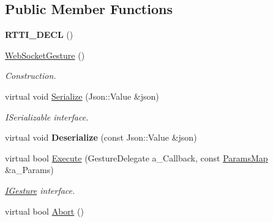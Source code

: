 \subsection*{Public Member Functions}
\begin{DoxyCompactItemize}
\item 
\mbox{\label{class_web_socket_gesture_a6c73dc4db74600f974b2378c9bc7949b}} 
{\bfseries R\+T\+T\+I\+\_\+\+D\+E\+CL} ()
\item 
\mbox{\label{class_web_socket_gesture_a2f02711e725da18c2e2d3fc305a26e57}} 
\hyperlink{class_web_socket_gesture_a2f02711e725da18c2e2d3fc305a26e57}{Web\+Socket\+Gesture} ()
\begin{DoxyCompactList}\small\item\em Construction. \end{DoxyCompactList}\item 
\mbox{\label{class_web_socket_gesture_afff9bc7e818b8fde0cdf37100430d5b4}} 
virtual void \hyperlink{class_web_socket_gesture_afff9bc7e818b8fde0cdf37100430d5b4}{Serialize} (Json\+::\+Value \&json)
\begin{DoxyCompactList}\small\item\em I\+Serializable interface. \end{DoxyCompactList}\item 
\mbox{\label{class_web_socket_gesture_ac47e05d2eed7b42a782e36d30615c2ed}} 
virtual void {\bfseries Deserialize} (const Json\+::\+Value \&json)
\item 
\mbox{\label{class_web_socket_gesture_ad783a6eef384b037b5272e41d86e1305}} 
virtual bool \hyperlink{class_web_socket_gesture_ad783a6eef384b037b5272e41d86e1305}{Execute} (Gesture\+Delegate a\+\_\+\+Callback, const \hyperlink{class_params_map}{Params\+Map} \&a\+\_\+\+Params)
\begin{DoxyCompactList}\small\item\em \hyperlink{class_i_gesture}{I\+Gesture} interface. \end{DoxyCompactList}\item 
\mbox{\label{class_web_socket_gesture_a22141af446c953234867ad6a6de996cf}} 
virtual bool \hyperlink{class_web_socket_gesture_a22141af446c953234867ad6a6de996cf}{Abort} ()

\end{DoxyCompactItemize}
